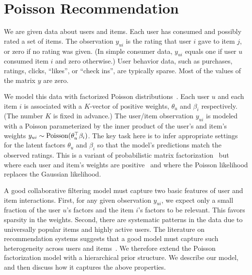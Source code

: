 \section{Poisson Recommendation}
\label{sec:model}


We are given data about users and items.  Each user has consumed and
possibly rated a set of items.  The observation $y_{ui}$ is the rating
that user $i$ gave to item $j$, or zero if no rating was given.  (In
simple consumer data, $y_{ui}$ equals one if user $u$ consumed item
$i$ and zero otherwise.)  User behavior data, such as purchases,
ratings, clicks, ``likes'', or ``check ins'', are typically sparse.
Most of the values of the matrix $y$ are zero.

We model this data with factorized Poisson
distributions~\cite{Canny:2004}. Each user $u$ and each item $i$ is
associated with a $K$-vector of positive weights, $\theta_u$ and
$\beta_i$ respectively.  (The number $K$ is fixed in advance.)  The
user/item observation $y_{ui}$ is modeled with a Poisson parameterized
by the inner product of the user's and item's weights $y_{ui} \sim
\textrm{Poisson}(\theta_u^\top \beta_i)$. The key task here is to infer
appropriate settings for the latent factors $\theta_u$ and $\beta_i$
so that the model's predictions match the observed ratings.
This is a variant of probabilistic matrix
factorization~\cite{Salakhutdinov:2008a} but where each user and
item's weights are positive~\cite{Lee:1999} and where the Poisson
likelihood replaces the Gaussian likelihood.

A good collaborative filtering model must capture two basic features
of user and item interactions. First, for any given observation
$y_{ui}$, we expect only a small fraction of the user $u$'s factors
and the item $i$'s factors to be relevant. This favors sparsity in the
weights. Second, there are systematic patterns in the data due to
universally popular items and highly active users. The
literature on recommendation systems suggests that a good model must
capture such heterogeneity across users and items~\cite{Koren:2009}. We
therefore extend the Poisson factorization model with a hierarchical
prior structure. We describe our model, and then discuss how it
captures the above properties.


